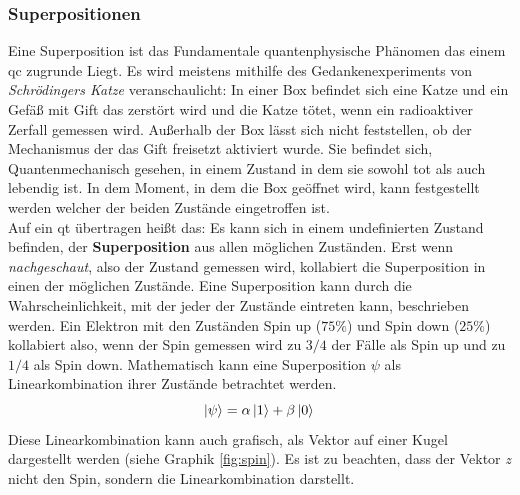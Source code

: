 \subsubsection{Superpositionen}
Eine Superposition ist das Fundamentale quantenphysische Phänomen das einem \ac{qc} zugrunde Liegt.
Es wird meistens mithilfe des Gedankenexperiments von \cite[\$5]{schrodinger_gegenwartige_1935} \textit{Schrödingers Katze} veranschaulicht: In einer Box befindet sich eine Katze und ein Gefäß mit Gift das zerstört wird und die Katze tötet, wenn ein radioaktiver Zerfall gemessen wird. Außerhalb der Box lässt sich nicht feststellen, ob der Mechanismus der das Gift freisetzt aktiviert wurde. Sie befindet sich, Quantenmechanisch gesehen, in einem Zustand in dem sie sowohl tot als auch lebendig ist. In dem Moment, in dem die Box geöffnet wird, kann festgestellt werden welcher der beiden Zustände eingetroffen ist.\\
Auf ein \ac{qt} übertragen heißt das: Es kann sich in einem undefinierten Zustand befinden, der \textbf{Superposition} aus allen möglichen Zuständen. Erst wenn \textit{nachgeschaut}, also der Zustand gemessen wird, kollabiert die Superposition in einen der möglichen Zustände. Eine Superposition kann durch die Wahrscheinlichkeit, mit der jeder der Zustände eintreten kann, beschrieben werden. Ein Elektron mit den Zuständen Spin up ($75\%$) und Spin down ($25\%$) kollabiert also, wenn der Spin gemessen wird zu $3/4$ der Fälle als Spin up und zu $1/4$ als Spin down.
Mathematisch kann eine Superposition $\psi$ als Linearkombination ihrer Zustände betrachtet werden. 
\begin{equation}
    \ket{\psi } = \alpha \ket{1} + \beta \ket{0} \\
\end{equation}
Diese Linearkombination kann auch grafisch, als Vektor auf einer Kugel dargestellt werden (siehe Graphik \ref{fig:spin}). Es ist zu beachten, dass der Vektor \textit{z} nicht den Spin, sondern die Linearkombination darstellt.

